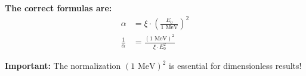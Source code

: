 	\begin{tcolorbox}[colback=blue!5!white,colframe=blue!75!black]
		\textbf{The correct formulas are:}
		\begin{align*}
			\alpha &= \xi \cdot \left(\frac{E_0}{1 \text{ MeV}}\right)^2 \\
			\frac{1}{\alpha} &= \frac{(1 \text{ MeV})^2}{\xi \cdot E_0^2}
		\end{align*}
	\end{tcolorbox}
	
	\begin{tcolorbox}[colback=red!5!white,colframe=red!75!black]
		\textbf{Important:} The normalization $(1 \text{ MeV})^2$ is essential for dimensionless results!
	\end{tcolorbox}
